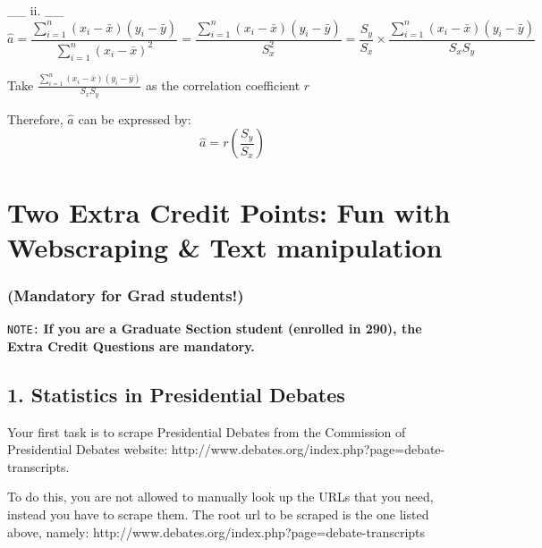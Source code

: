 \documentclass[11pt]{article}
\begin{document}
    \_\_ ii. \_\_ \[
\hat{a} = \frac{\sum_{i=1}^{n}(x_i-\bar{x})(y_i - \bar{y})}{\sum_{i=1}^{n}(x_i - \bar{x})^2} = \frac{\sum_{i=1}^{n}(x_i-\bar{x})(y_i - \bar{y})}{S_x^2} = \frac{S_y}{S_x} \times \frac{\sum_{i=1}^{n}(x_i-\bar{x})(y_i - \bar{y})}{S_x S_y}
\]

Take \(\frac{\sum_{i=1}^{n}(x_i-\bar{x})(y_i - \bar{y})}{S_x S_y}\) as
the correlation coefficient \(r\)

Therefore, \(\hat{a}\) can be expressed by: \[
\hat{a} = r(\frac{S_y}{S_x})
\]

    \hypertarget{two-extra-credit-points-fun-with-webscraping-text-manipulation}{%
\section{Two Extra Credit Points: Fun with Webscraping \& Text
manipulation}\label{two-extra-credit-points-fun-with-webscraping-text-manipulation}}

\hypertarget{mandatory-for-grad-students}{%
\subsubsection{(Mandatory for Grad
students!)}\label{mandatory-for-grad-students}}

    \texttt{NOTE:} \textbf{If you are a Graduate Section student (enrolled
in 290), the Extra Credit Questions are mandatory.}

    \hypertarget{statistics-in-presidential-debates}{%
\subsection{1. Statistics in Presidential
Debates}\label{statistics-in-presidential-debates}}

Your first task is to scrape Presidential Debates from the Commission of
Presidential Debates website:
http://www.debates.org/index.php?page=debate-transcripts.

To do this, you are not allowed to manually look up the URLs that you
need, instead you have to scrape them. The root url to be scraped is the
one listed above, namely:
http://www.debates.org/index.php?page=debate-transcripts
\end{document}
